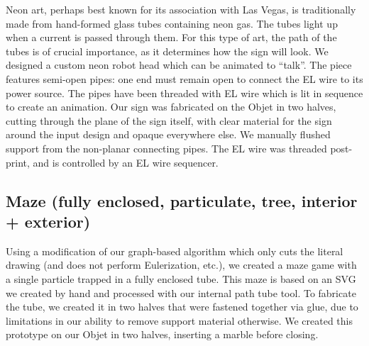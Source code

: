 Neon art, perhaps best known for its association with Las Vegas, is traditionally made from hand-formed glass tubes containing neon gas.  The tubes light up when a current is passed through them.  For this type of art, the path of the tubes is of crucial importance, as it determines how the sign will look.  We designed a custom neon robot head which can be animated to ``talk''.  The piece features semi-open pipes: one end must remain open to connect the EL wire to its power source.  The pipes have been threaded with EL wire which is lit in sequence to create an animation.  Our sign was fabricated on the Objet in two halves, cutting through the plane of the sign itself, with clear material for the sign around the input design and opaque everywhere else.  We manually flushed support from the non-planar connecting pipes.  The EL wire was threaded post-print, and is controlled by an EL wire sequencer.

\subsection{Maze (fully enclosed, particulate, tree, interior + exterior)}

Using a modification of our graph-based algorithm which only cuts the literal drawing (and does not perform Eulerization, etc.), we created a maze game with a single particle trapped in a fully enclosed tube.  This maze is based on an SVG we created by hand and processed with our internal path tube tool.  To fabricate the tube, we created it in two halves that were fastened together via glue, due to limitations in our ability to remove support material otherwise.     We created this prototype on our Objet in two halves, inserting a marble before closing.